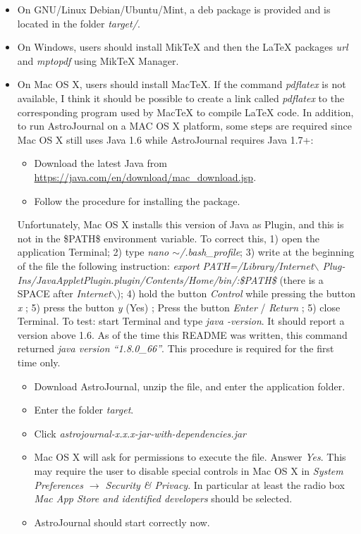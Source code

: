\begin{itemize}
 \item On GNU/Linux Debian/Ubuntu/Mint, a deb package is provided and is located in the folder \textit{target/}.
 \item On Windows, users should install MikTeX and then the LaTeX packages \textit{url} and \textit{mptopdf} using MikTeX Manager.
 \item On Mac OS X, users should install MacTeX. If the command \textit{pdflatex} is not available, I think it should be possible to create a link called \textit{pdflatex} to the corresponding program used by MacTeX to compile LaTeX code. In addition, to run AstroJournal on a MAC OS X platform, some steps are required since Mac OS X still uses Java 1.6 while AstroJournal requires Java 1.7+: 
\begin{itemize}
 \item Download the latest Java from\\ \href{https://java.com/en/download/mac\_download.jsp}{https://java.com/en/download/mac\_download.jsp}.
 \item Follow the procedure for installing the package.
\end{itemize}
Unfortunately, Mac OS X installs this version of Java as Plugin, and this is not in the \$PATH\$ environment variable. To correct this, 1) open the application Terminal; 2) type \textit{nano $\sim$/.bash\_profile}; 3) write at the beginning of the file the following instruction: \textit{export PATH=/Library/Internet$\backslash$ Plug-Ins/JavaAppletPlugin.plugin/Contents/Home/bin/:\$PATH\$} (there is a SPACE after \textit{Internet$\backslash$}); 4) hold the button \textit{Control} while pressing the button \textit{x} ; 5) press the button \textit{y} (Yes) ; Press the button \textit{Enter} / \textit{Return} ; 5) close Terminal. To test: start Terminal and type \textit{java -version}. It should report a version above 1.6. As of the time this README was written, this command returned \textit{java version ``1.8.0\_66''}. This procedure is required for the first time only. 
\begin{itemize}
 \item Download AstroJournal, unzip the file, and enter the application folder.
 \item Enter the folder \textit{target}.
 \item Click \textit{astrojournal-x.x.x-jar-with-dependencies.jar}
 \item Mac OS X will ask for permissions to execute the file. Answer \textit{Yes}. This may require the user to disable special controls in Mac OS X in \textit{System Preferences $\rightarrow$ Security \& Privacy}. In particular at least the radio box \textit{Mac App Store and identified developers} should be selected. 
 \item AstroJournal should start correctly now.
\end{itemize}

\end{itemize}



